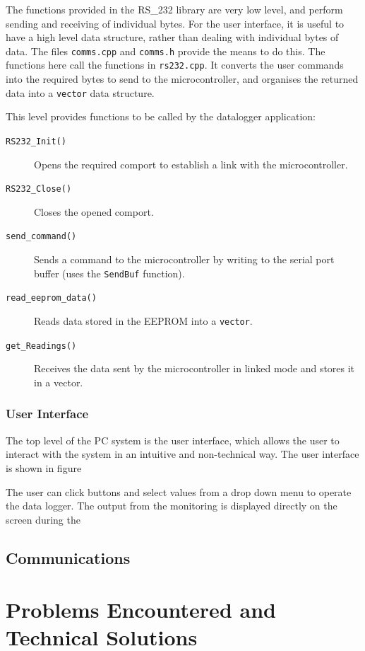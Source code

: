 \documentclass[a4paper,10pt]{article}  %
\begin{document}
The functions provided in the RS\_232 library are very low level, and
perform sending and receiving of individual bytes. For the user
interface, it is useful to have a high level data structure, rather
than dealing with individual bytes of data. The files
\texttt{comms.cpp} and \texttt{comms.h} provide the means to do
this. The functions here call the functions in \texttt{rs232.cpp}. It
converts the user commands into the required bytes to send to the
microcontroller, and organises the returned data into a
\texttt{vector} data structure.

This level provides functions to be called by the datalogger
application:
\begin{description}
  \item[\texttt{RS232\_Init()}] Opens the required comport to
    establish a link with the microcontroller.
  \item[\texttt{RS232\_Close()}] Closes the opened comport.
  \item[\texttt{send\_command()}] Sends a command to the
    microcontroller by writing to the serial port buffer (uses the
    \texttt{SendBuf} function).
  \item[\texttt{read\_eeprom\_data()}] Reads data stored in the EEPROM
    into a \texttt{vector}.
  \item[\texttt{get\_Readings()}] Receives the data sent by the
    microcontroller in linked mode and stores it in a vector.
\end{description}

\subsubsection{User Interface}

The top level of the PC system is the user interface, which allows the
user to interact with the system in an intuitive and non-technical
way. The user interface is shown in figure



The user can click buttons and select values from a drop down menu to
operate the data logger. The output from the monitoring is displayed
directly on the screen during the 

\subsection{Communications}

\section{Problems Encountered and Technical Solutions}
\label{sec:probl-enco-techn}
\end{document}
